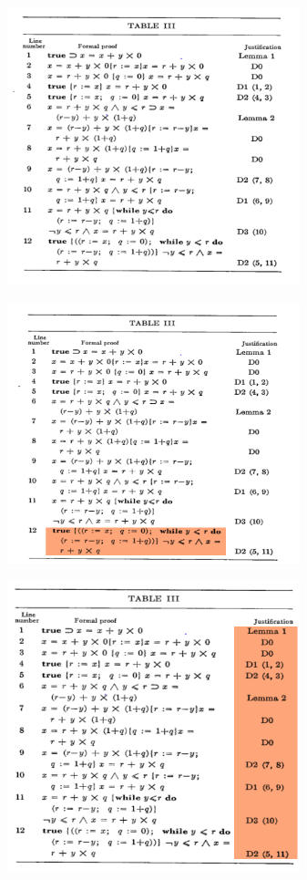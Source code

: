 \documentclass{beamer}
\begin{document}
\begin{frame}
	\center
	\includegraphics[width = 8.5cm] {proof1.png}
\end{frame}
\begin{frame}
        \center
        \includegraphics[width = 8.5cm] {proof2.png}
\end{frame}
\begin{frame}
        \center
        \includegraphics[width = 8.5cm] {proof3.png}
\end{frame}
\end{document}
